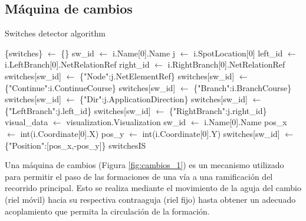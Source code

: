 \subsection{Máquina de cambios}
    \label{sec:switches}

    \begin{algorithm}
            \caption{Switches detector algorithm}
            \label{alg:switches}
            \begin{algorithmic}
                \STATE \{switches\} $\gets$ \{\}
                            \STATE sw\_id $\gets$ i.Name[0].Name
                            \STATE j $\gets$ i.SpotLocation[0]
                            \STATE left\_id $\gets$ i.LeftBranch[0].NetRelationRef
                            \STATE right\_id $\gets$ i.RightBranch[0].NetRelationRef
                            \STATE switches[sw\_id] $\gets$ \{"Node":j.NetElementRef\}
                            \STATE switches[sw\_id] $\gets$ \{"Continue":i.ContinueCourse\}
                            \STATE switches[sw\_id] $\gets$ \{"Branch":i.BranchCourse\}
                            \STATE switches[sw\_id] $\gets$ \{"Dir":j.ApplicationDirection\}
                            \STATE switches[sw\_id] $\gets$ \{"LeftBranch":j.left\_id\}
                            \STATE switches[sw\_id] $\gets$ \{"RightBranch":j.right\_id\}
                        \ENDIF
                    \ENDFOR
                \ENDIF
                \STATE visual\_data $\gets$ visualization.Visualization
                        \STATE sw\_id $\gets$ i.Name[0].Name
                            \STATE pos\_x $\gets$ int(i.Coordinate[0].X)
                            \STATE pos\_y $\gets$ int(i.Coordinate[0].Y)
                            \STATE switches[sw\_id] $\gets$ \{"Position":[pos\_x,-pos\_y]\}
                        \ENDIF 
                    \ENDFOR
                \ENDIF
            \OUTPUT switchesIS
            \end{algorithmic}
        \end{algorithm}
        
    Una máquina de cambios (Figura \ref{fig:cambios_1}) es un mecanismo utilizado para permitir el paso de las formaciones de una vía a una ramificación del recorrido principal. Esto se realiza mediante el movimiento de la aguja del cambio (riel móvil) hacia su respectiva contraaguja (riel fijo) hasta obtener un adecuado acoplamiento que permita la circulación de la formación.

